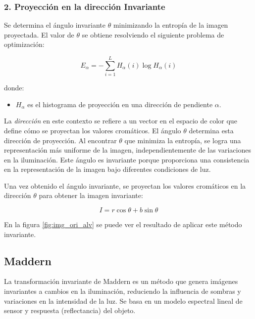 \subsubsection{2. Proyección en la dirección Invariante}

Se determina el ángulo invariante $\theta$ minimizando la entropía de la imagen proyectada. El valor de $\theta$ se obtiene resolviendo el siguiente problema de optimización:

$$E_{\alpha } =-\sum_{i=1}^L H_{\alpha } (i)\log H_{\alpha } (i)$$

donde:

\begin{itemize}
\setlength{\itemsep}{-1ex}
   \item{\begin{flushleft} $H_{\alpha }$ es el histograma de proyección en una dirección de pendiente $\alpha$. \end{flushleft}}
\end{itemize}

La \textit{dirección} en este contexto se refiere a un vector en el espacio de color que define cómo se proyectan los valores cromáticos. El ángulo $\theta$ determina esta dirección de proyección. Al encontrar 
$\theta$ que minimiza la entropía, se logra una representación más uniforme de la imagen, independientemente de las variaciones en la iluminación. Este ángulo es invariante porque proporciona una consistencia en la representación de la imagen bajo diferentes condiciones de luz.

Una vez obtenido el ángulo invariante, se proyectan los valores cromáticos en la dirección $\theta$ para obtener la imagen invariante:

$$I=r\cos \theta +b\sin \theta$$

En la figura \ref{fig:img_ori_alv} se puede ver el resultado de aplicar este método invariante.


\subsection{Maddern}\label{maddern}

La transformación invariante de Maddern \cite{maddern2014} es un método que genera imágenes invariantes a cambios en la iluminación, reduciendo la influencia de sombras y variaciones en la intensidad de la luz. Se basa en un modelo espectral lineal de sensor y respuesta (reflectancia) del objeto.

